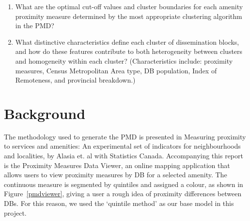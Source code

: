 \documentclass[11pt, a4paper]{article}
\begin{document}
\begin{enumerate}
\item What are the optimal cut-off values and cluster boundaries for each amenity proximity measure determined by the most appropriate clustering algorithm in the PMD?
\item What distinctive characteristics define each cluster of dissemination blocks, and how do these features contribute to both heterogeneity between clusters and homogeneity within each cluster? (Characteristics include: proximity measures, Census Metropolitan Area type, DB population, Index of Remoteness, and provincial breakdown.)
\end{enumerate}









\pagebreak
\section{Background}


The methodology used to generate the PMD is presented in Measuring proximity to services and amenities: An experimental set of indicators for neighbourhoods and localities, by Alasia et. al with Statistics Canada. Accompanying this report is the Proximity Measures Data Viewer, an online mapping application that allows users to view proximity measures by DB for a selected amenity. The continuous measure is segmented by quintiles and assigned a colour, as shown in Figure~\ref{pmdviewer}, giving a user a rough idea of proximity differences between DBs. For this reason, we used the `quintile method' as our base model in this project.
\end{document}
